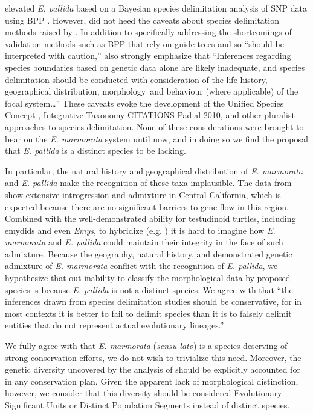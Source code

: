 \documentclass[12pt,letterpaper]{article}
\begin{document}
\citet{Spinks2014} elevated \textit{E. pallida} based on a Bayesian species delimitation analysis of SNP data using BPP \citep{Yang2010b}. However, \citet{Spinks2014} did not heed the caveats about species delimitation methods raised by \citet{Carstens2013}. In addition to specifically addressing the shortcomings of validation methods such as BPP that rely on guide trees and so “should be interpreted with caution,” \citet{Carstens2013} also strongly emphasize that ``Inferences regarding species boundaries based on genetic data alone are likely inadequate, and species delimitation should be conducted with consideration of the life history, geographical distribution, morphology and behaviour (where applicable) of the focal system\dots'' These caveats evoke the development of the Unified Species Concept \citep{Dayrat2005a,DeQueiroz2007b}, Integrative Taxonomy CITATIONS Padial 2010, and other pluralist approaches to species delimitation. None of these considerations were brought to bear on the \textit{E. marmorata} system until now, and in doing so we find the proposal that \textit{E. pallida} is a distinct species to be lacking.

In particular, the natural history and geographical distribution of \textit{E. marmorata} and \textit{E. pallida} make the recognition of these taxa implausible. The data from \citet{Spinks2014} show extensive introgression and admixture in Central California, which is expected because there are no significant barriers to gene flow in this region. Combined with the well-demonstrated ability for testudinoid turtles, including emydids and even \textit{Emys}, to hybridize (e.g. \citealt{Buskirk2005,Spinks2009,Parham2013}) it is hard to imagine how \textit{E. marmorata} and \textit{E. pallida} could maintain their integrity in the face of such admixture. Because the geography, natural history, and demonstrated genetic admixture of \textit{E. marmorata} conflict with the recognition of \textit{E. pallida}, we hypothesize that out inability to classify the morphological data by proposed species is because \textit{E. pallida} is not a distinct species. We agree with \citet{Carstens2013} that ``the inferences drawn from species delimitation studies should be conservative, for in most contexts it is better to fail to delimit species than it is to falsely delimit entities that do not represent actual evolutionary lineages.'' 

We fully agree with \citet{Spinks2014} that \textit{E. marmorata} (\textit{sensu lato}) is a species deserving of strong conservation efforts, we do not wish to trivialize this need. Moreover, the genetic diversity uncovered by the analysis of \citet{Spinks2014} should be explicitly accounted for in any conservation plan. Given the apparent lack of morphological distinction, however, we consider that this diversity should be considered Evolutionary Significant Units or Distinct Population Segments instead of distinct species.
\end{document}
